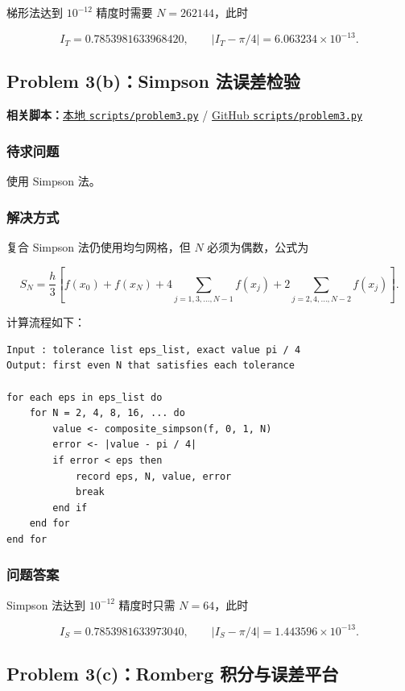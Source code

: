 \documentclass[12pt,a4paper,fontset=none]{ctexart}
\newcommand{\fileinline}[1]{{\urlstyle{same}\nolinkurl{#1}}}
\newcommand{\metadataline}[1]{#1}
\newcommand{\scriptpath}[1]{\fileinline{#1}}
\newcommand{\githubscriptsbase}{https://github.com/Void0312Aurora/computational-physics-homework-2026/blob/main/07/scripts}
\newcommand{\scriptlink}[1]{\noindent\metadataline{\textbf{相关脚本：}\href{../../../scripts/#1}{本地 \scriptpath{scripts/#1}} / \href{\githubscriptsbase/#1}{GitHub \scriptpath{scripts/#1}}}\par\medskip}
\begin{document}
梯形法达到 \(10^{-12}\) 精度时需要 \(N=262144\)，此时

\[
I_T=0.7853981633968420,
\qquad
|I_T-\pi/4|=6.063234\times10^{-13}.
\]

\subsection{Problem 3(b)：Simpson 法误差检验}\label{problem-3b}

\scriptlink{problem3.py}

\subsubsection{待求问题}\label{ux5f85ux6c42ux95eeux9898-5}

使用 Simpson 法。

\subsubsection{解决方式}\label{ux89e3ux51b3ux65b9ux5f0f-5}

复合 Simpson 法仍使用均匀网格，但 \(N\) 必须为偶数，公式为

\[
S_N=\frac{h}{3}\left[f(x_0)+f(x_N)
+4\sum_{j=1,3,\ldots,N-1}f(x_j)
+2\sum_{j=2,4,\ldots,N-2}f(x_j)\right].
\]

计算流程如下：

\begin{verbatim}
Input : tolerance list eps_list, exact value pi / 4
Output: first even N that satisfies each tolerance

for each eps in eps_list do
    for N = 2, 4, 8, 16, ... do
        value <- composite_simpson(f, 0, 1, N)
        error <- |value - pi / 4|
        if error < eps then
            record eps, N, value, error
            break
        end if
    end for
end for
\end{verbatim}

\subsubsection{问题答案}\label{ux95eeux9898ux7b54ux6848-5}

Simpson 法达到 \(10^{-12}\) 精度时只需 \(N=64\)，此时

\[
I_S=0.7853981633973040,
\qquad
|I_S-\pi/4|=1.443596\times10^{-13}.
\]

\subsection{Problem 3(c)：Romberg 积分与误差平台}\label{problem-3c}
\end{document}
